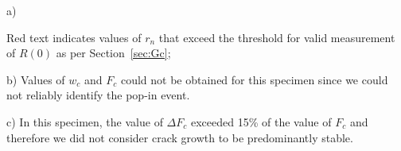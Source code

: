 \documentclass[12pt,onecolumn]{article}
\begin{document}
\begin{landscape}
\begin{table}
{\begin{threeparttable}
\begin{tablenotes}
\item[a)] {\footnotesize Red text indicates values of $r_n$ that exceed the threshold for valid measurement of $R(0)$ as per Section~\ref{sec:Gc};
\item[b)] Values of $w_c$ and $F_c$ could not be obtained for this specimen since we could not reliably identify the pop-in event.
\item[c)] In this specimen, the value of $\Delta F_c$ exceeded 15\% of the value of $F_c$ and therefore we did not consider crack growth to be predominantly stable.}
\end{tablenotes}
\end{threeparttable}
}
\end{table}

\end{landscape}
\restoregeometry
\end{document}
